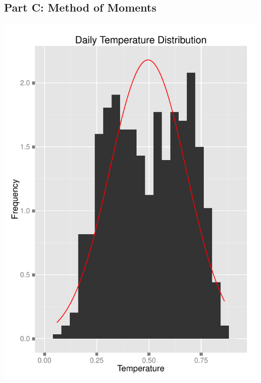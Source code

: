 \documentclass[11pt]{article}
\begin{document}
\subsection{Part C: Method of Moments}
\label{subsesc:problem3moments}
\includegraphics{Problem3CMoments.pdf}
\newline
\pagebreak
\end{document}
